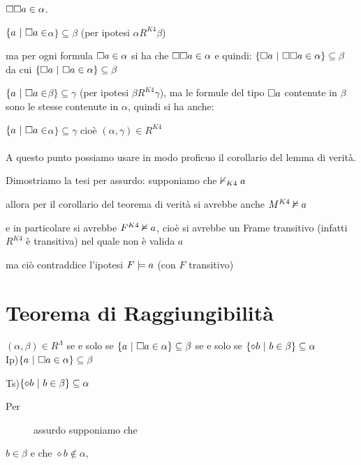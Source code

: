 %
$\square\square a\in\alpha$\foreignlanguage{italian}{.}

%
$\{a\ |\ \boa\in$$\alpha\}\subseteq\beta$ (per ipotesi $\alpha R^{K4}\beta$)

ma per ogni formula $\square a\in\alpha$ si ha che $\square\square a\in\alpha$
e quindi: $\{\square a\ |\ \square\square a\in\alpha\}\subseteq\beta$ da
cui $\{\square a\ |\ \square a\in\alpha\}\subseteq\beta$

%
$\{a\ |\ \boa\in$$\beta\}\subseteq\gamma$\foreignlanguage{italian}{
(per ipotesi $\beta R^{K4}\gamma$), ma le formule del tipo $\square a$
contenute in $\beta$ sono le stesse contenute in $\alpha$, quindi
si ha anche:}

%
$\{a\ |\ \boa\in$$\alpha\}\subseteq\gamma$ cioè $(\alpha,\gamma)\in R^{K4}$
\foreignlanguage{english}{}\\
\foreignlanguage{english}{ }\\
\foreignlanguage{english}{ }A questo punto possiamo usare in modo
proficuo il corollario del lemma di verità.

Dimostriamo la tesi per assurdo: supponiamo che $\nvdash_{K4}a$

allora per il corollario del teorema di verità si avrebbe anche $M{}^{K4}\nvDash a$

e in particolare si avrebbe $F^{K4}\nvDash a$, cioè si avrebbe
un Frame transitivo (infatti $R^{K4}$ è transitiva) nel quale non
è valida $a$

ma ciò contraddice l'ipotesi $F\models a$ (con $F$ transitivo) \lightning\\



\section{Teorema di Raggiungibilità}

$(\alpha,\beta)\in R^{\Lambda}$ se e solo se $\{a\ |\ \square a\in\alpha\}\subseteq\beta$
se e solo se \foreignlanguage{english}{$\{\diamond b\ |\ b\in\beta\}\subseteq\alpha$}
\\
 Ip)$\{a\ |\ \square a\in\alpha\}\subseteq\beta$

Ts)$\{\diamond b\ |\ b\in\beta\}\subseteq\alpha$\\

\begin{description}
\item [{Per}] assurdo supponiamo che
\end{description}
$b\in\beta$ e che $\diamond b\notin\alpha$,

